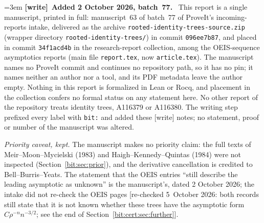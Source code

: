 \documentclass[11pt]{article}
\theoremstyle{definition}\newtheorem{definition}[theorem]{Definition}
\theoremstyle{remark}\newtheorem{remark}[theorem]{Remark}
\newenvironment{writenote}[1][]{\par\smallskip\begingroup\small\emergencystretch=3em
 \noindent\textbf{[write]}\if\relax\detokenize{#1}\relax\else~\textbf{#1.}\fi\ }%
 {\par\endgroup\smallskip}
\begin{document}
\begin{writenote}[Added 2 October 2026, batch~77]
This report is a single manuscript, printed in full: manuscript~63 of
batch~77 of ProveIt's incoming-reports intake, delivered as the archive
\texttt{rooted-\allowbreak identity-\allowbreak trees-\allowbreak source.zip}
(wrapper directory \texttt{rooted-\allowbreak identity-\allowbreak trees/}) in
commit \texttt{096ee7b87}, and placed in commit \texttt{34f1acd4b} in the
research-report collection, among the OEIS-sequence asymptotics reports (main
file \texttt{report.tex}, now \texttt{article.tex}). The manuscript names no
ProveIt commit and continues no repository path, so it has no pin; it names
neither an author nor a tool, and its PDF metadata leave the author empty.
Nothing in this report is formalized in Lean or Rocq, and placement in the
collection confers no formal status on any statement here. No other report of
the repository treats identity trees, A116379 or A116380. The writing step
prefixed every label with \texttt{bit:} and added these \textsf{[write]} notes;
no statement, proof or number of the manuscript was altered.

\emph{Priority caveat, kept.} The manuscript makes no priority claim: the full
texts of Meir--Moon--Mycielski (1983) and Haigh--Kennedy--Quintas (1984) were
not inspected (Section~\ref{bit:sec:prior}), and the derivative cancellation is
credited to Bell--Burris--Yeats. The statement that the OEIS entries ``still
describe the leading asymptotic as unknown'' is the manuscript's, dated
2 October 2026; the intake did not re-check the OEIS pages
\textup{[}re-checked 5~October 2026: both records still state that it is not
known whether these trees have the asymptotic form $C\rho^{-n}n^{-3/2}$; see
the end of Section~\ref{bit:cert:sec:further}\textup{]}.


\end{writenote}
\end{document}
